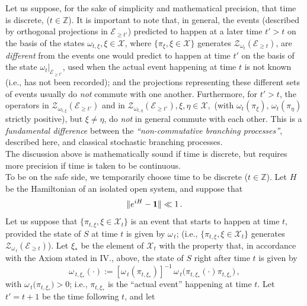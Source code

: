 \documentclass[a4paper,11pt]{article}
\begin{document}
Let us suppose, for the sake of simplicity and mathematical precision, that time is discrete, ($t\in \mathbb{Z}$). It is important to note that, in general, the events (described by orthogonal projections in $\mathcal{E}_{\geq t'}$) predicted to happen at a later time $t'>t$ on the basis of the states $\omega_{t, \xi}, \xi \in \mathcal{X}$, where \mbox{$\lbrace \pi_{\xi}, \xi \in \mathcal{X} \rbrace$} generates $\mathcal{Z}_{\omega_t}(\mathcal{E}_{\geq t})$, are \textit{different} from the events one would predict to happen at time $t'$ on the basis of the state $\omega_{t}\vert_{\mathcal{E}_{\geq t'}}$, used when the actual event happening at time $t$ is not known (i.e., has not been recorded); and the projections representing these different sets of events usually do \textit{not} commute with one another. 
Furthermore, for $t'>t$, the operators in $\mathcal{Z}_{\omega_{t, \xi}}(\mathcal{E}_{\geq t'})$ and in 
$\mathcal{Z}_{\omega_{t, \eta}}(\mathcal{E}_{\geq t'}), \xi, \eta \in \mathcal{X},$ (with $\omega_{t}(\pi_{\xi}), \,\omega_{t}(\pi_{\eta})$ strictly positive), but $\xi \not= \eta$, do \textit{not} in general commute with each other. This is a \textit{fundamental difference} between the \textit{``non-commutative branching processes''}, described here, and classical stochastic branching processes.\\
The discussion above is mathematically sound if time is discrete, but requires more precision if time is taken to be continuous.\\
To be on the safe side, we temporarily choose time to be discrete ($t\in \mathbb{Z}$). Let $H$ be the Hamiltonian of an isolated open system, and suppose that 
\begin{equation} \label{H}
\Vert e^{iH} - {\bf{1}} \Vert \ll 1\,.
\end{equation}
Let us suppose that $\lbrace \pi_{t,\xi} , \xi \in \mathcal{X}_{t} \rbrace$ is an event that starts to happen at time $t$, provided the state of $S$ at time $t$ is given by $\omega_{\,t}$; (i.e., $\lbrace \pi_{t,\xi} , \xi \in \mathcal{X}_{t} \rbrace$ generates $\mathcal{Z}_{\omega_{\,t}}(\mathcal{E}_{\geq t})$). Let $\xi_{*}$ be the element of $\mathcal{X}_{t}$ with the property that, in accordance with the Axiom stated in IV., above, the state of $S$ right after time $t$ is given by 
$$\omega_{\,t, \xi_{*}}(\cdot):=[\omega_{\,t}(\pi_{t, \xi_{*}})]^{-1}\,\omega_{\,t}\big(\pi_{t, \xi_{*}} (\cdot) \pi_{t, \xi_{*}}\big)\,,$$
with $\omega_{\,t}\big( \pi_{t, \xi_{*}} \big) > 0$; i.e., $\pi_{t,\xi_{*}}$ is the ``actual event'' happening at time $t$. Let $t' = t+1$ be the time following $t$, and let 
\end{document}
